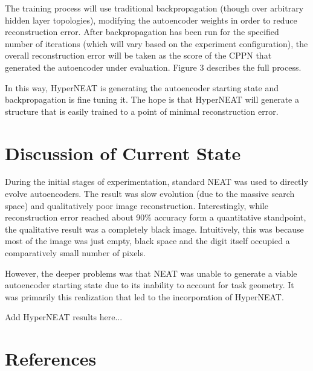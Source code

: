 \documentclass{acm_proc_article-sp}
\begin{document}
The training process will use traditional backpropagation (though over arbitrary hidden layer topologies), modifying the autoencoder weights in order to reduce reconstruction error.  After backpropagation has been run for the specified number of iterations (which will vary based on the experiment configuration), the overall reconstruction error will be taken as the score of the CPPN that generated the autoencoder under evaluation.  Figure 3 describes the full process.

In this way, HyperNEAT is generating the autoencoder starting state and backpropagation is fine tuning it.  The hope is that HyperNEAT will generate a structure that is easily trained to a point of minimal reconstruction error.


\section{Discussion of Current State}
During the initial stages of experimentation, standard NEAT was used to directly evolve autoencoders.  The result was slow evolution (due to the massive search space) and qualitatively poor image reconstruction.  Interestingly, while reconstruction error reached about 90\% accuracy form a quantitative standpoint, the qualitative result was a completely black image.  Intuitively, this was because most of the image was just empty, black space and the digit itself occupied a comparatively small number of pixels.

However, the deeper problems was that NEAT was unable to generate a viable autoencoder starting state due to its inability to account for task geometry.  It was primarily this realization that led to the incorporation of HyperNEAT.

Add HyperNEAT results here...

\section{References}

\end{document}
